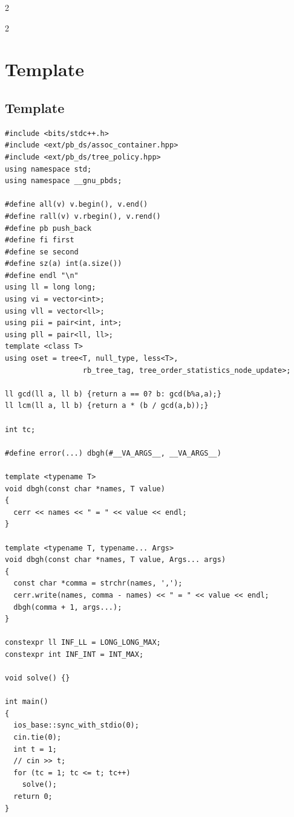 \documentclass[twoside]{article}
\begin{document}
\pagestyle{fancy}
\newpage

\selectfont
\color{coolgray}
\begin{multicols*}{2}
	\tableofcontents
\end{multicols*}


\begin{multicols*}{2}
	{
		\section*{Template}
	}
	{
		\subsection*{Template}
	}
	\begin{verbatim}
#include <bits/stdc++.h>
#include <ext/pb_ds/assoc_container.hpp>
#include <ext/pb_ds/tree_policy.hpp>
using namespace std;
using namespace __gnu_pbds;

#define all(v) v.begin(), v.end()
#define rall(v) v.rbegin(), v.rend()
#define pb push_back
#define fi first
#define se second
#define sz(a) int(a.size())
#define endl "\n"
using ll = long long;
using vi = vector<int>;
using vll = vector<ll>;
using pii = pair<int, int>;
using pll = pair<ll, ll>;
template <class T>
using oset = tree<T, null_type, less<T>,
                  rb_tree_tag, tree_order_statistics_node_update>;

ll gcd(ll a, ll b) {return a == 0? b: gcd(b%a,a);}
ll lcm(ll a, ll b) {return a * (b / gcd(a,b));}

int tc;

#define error(...) dbgh(#__VA_ARGS__, __VA_ARGS__)

template <typename T>
void dbgh(const char *names, T value)
{
  cerr << names << " = " << value << endl;
}

template <typename T, typename... Args>
void dbgh(const char *names, T value, Args... args)
{
  const char *comma = strchr(names, ',');
  cerr.write(names, comma - names) << " = " << value << endl;
  dbgh(comma + 1, args...);
}

constexpr ll INF_LL = LONG_LONG_MAX;
constexpr int INF_INT = INT_MAX;

void solve() {}

int main()
{
  ios_base::sync_with_stdio(0);
  cin.tie(0);
  int t = 1;
  // cin >> t;
  for (tc = 1; tc <= t; tc++)
    solve();
  return 0;
}
\end{verbatim}


\end{multicols*}
\end{document}
